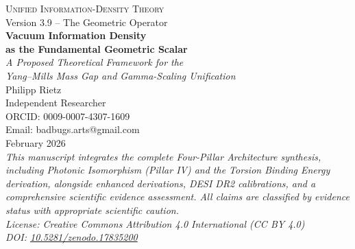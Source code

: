 \documentclass[12pt,a4paper,twoside]{article}
\theoremstyle{plain}
\theoremstyle{definition}
\theoremstyle{remark}
\begin{document}
\sloppy

\begin{titlepage}
\vspace*{-3em} 
\noindent
{}

\centering
\vspace*{2cm}
{\Large\scshape Unified Information-Density Theory}\\[0.5cm]
{\large Version 3.9 -- The Geometric Operator}\\[1cm]
{\Huge\bfseries Vacuum Information Density\\[0.3cm] 
as the Fundamental Geometric Scalar}\\[0.5cm]
{\Large\itshape A Proposed Theoretical Framework for the\\[0.2cm]
Yang--Mills Mass Gap and Gamma-Scaling Unification}\\[3cm]
{\large Philipp Rietz}\\[0.3cm]
{\normalsize Independent Researcher}\\
{\small ORCID: 0009-0007-4307-1609}\\
{\small Email: badbugs.arts@gmail.com}\\[0.6cm]
{\normalsize February 2026}\\[0.8cm]
\vfill
{\small\itshape
This manuscript integrates the complete Four-Pillar Architecture synthesis,
including Photonic Isomorphism (Pillar IV) and the Torsion Binding Energy
derivation, alongside enhanced derivations, DESI DR2 calibrations, and a
comprehensive scientific evidence assessment. All claims are classified by
evidence status with appropriate scientific caution.\\[0.5cm]
License: Creative Commons Attribution 4.0 International (CC BY 4.0)\\
DOI: \href{https://doi.org/10.5281/zenodo.17835200}{10.5281/zenodo.17835200}}
\end{titlepage}
\end{document}
